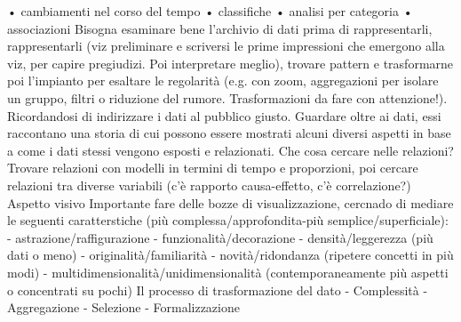•	cambiamenti nel corso del tempo
•	classifiche
•	analisi per categoria
•	associazioni 
Bisogna esaminare bene l'archivio di dati prima di rappresentarli, rappresentarli (viz preliminare e scriversi le prime impressioni che emergono alla viz, per capire pregiudizi. Poi interpretare meglio), trovare pattern e trasformarne poi l'impianto per esaltare le regolarità (e.g. con zoom, aggregazioni per isolare un gruppo, filtri o riduzione del rumore. Trasformazioni da fare con attenzione!).
Ricordandosi di indirizzare i dati al pubblico giusto.
Guardare oltre ai dati, essi raccontano una storia di cui possono essere mostrati alcuni diversi aspetti in base a come i dati stessi vengono esposti e relazionati.
Che cosa cercare nelle relazioni?
Trovare relazioni con modelli in termini di tempo e proporzioni, poi cercare relazioni tra diverse variabili (c'è rapporto causa-effetto, c'è correlazione?) 
Aspetto visivo
Importante fare delle bozze di visualizzazione, cercnado di mediare le seguenti caratterstiche (più complessa/approfondita-più semplice/superficiale):
-	astrazione/raffigurazione
-	funzionalità/decorazione
-	densità/leggerezza (più dati o meno)
-	originalità/familiarità
-	novità/ridondanza (ripetere concetti in più modi)
-	multidimensionalità/unidimensionalità (contemporaneamente più aspetti o concentrati su pochi)
Il processo di trasformazione del dato
-	Complessità
-	Aggregazione
-	Selezione 
-	Formalizzazione 


